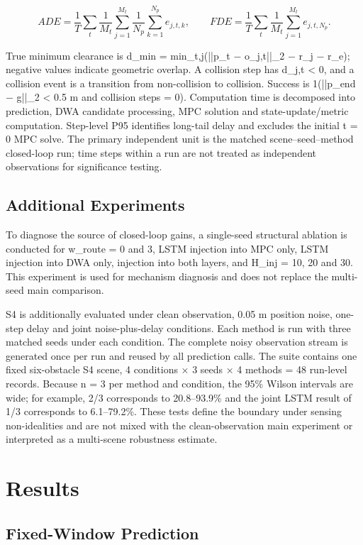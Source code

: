 \documentclass[10pt,a4paper]{article}
\begin{document}
\[
ADE=\frac{1}{T}\sum_t\frac{1}{M_t}\sum_{j=1}^{M_t}\frac{1}{N_p}\sum_{k=1}^{N_p}e_{j,t,k},\qquad
FDE=\frac{1}{T}\sum_t\frac{1}{M_t}\sum_{j=1}^{M_t}e_{j,t,N_p}.
\]

True minimum clearance is d\_min = min\_t,j(||p\_t − o\_j,t||\_2 − r\_j − r\_e); negative values indicate geometric overlap. A collision step has d\_j,t < 0, and a collision event is a transition from non-collision to collision. Success is 1(||p\_end − g||\_2 < 0.5 m and collision steps = 0). Computation time is decomposed into prediction, DWA candidate processing, MPC solution and state-update/metric computation. Step-level P95 identifies long-tail delay and excludes the initial t = 0 MPC solve. The primary independent unit is the matched scene–seed–method closed-loop run; time steps within a run are not treated as independent observations for significance testing.

\subsection{Additional Experiments}

To diagnose the source of closed-loop gains, a single-seed structural ablation is conducted for w\_route = 0 and 3, LSTM injection into MPC only, LSTM injection into DWA only, injection into both layers, and H\_inj = 10, 20 and 30. This experiment is used for mechanism diagnosis and does not replace the multi-seed main comparison.

S4 is additionally evaluated under clean observation, 0.05 m position noise, one-step delay and joint noise-plus-delay conditions. Each method is run with three matched seeds under each condition. The complete noisy observation stream is generated once per run and reused by all prediction calls. The suite contains one fixed six-obstacle S4 scene, 4 conditions × 3 seeds × 4 methods = 48 run-level records. Because n = 3 per method and condition, the 95\% Wilson intervals are wide; for example, 2/3 corresponds to 20.8–93.9\% and the joint LSTM result of 1/3 corresponds to 6.1–79.2\%. These tests define the boundary under sensing non-idealities and are not mixed with the clean-observation main experiment or interpreted as a multi-scene robustness estimate.

\section{Results}

\subsection{Fixed-Window Prediction}
\end{document}
